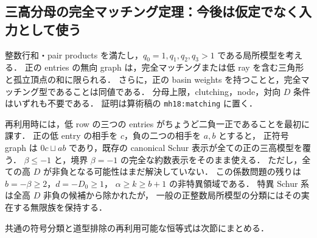 \subsection{三高分母の完全マッチング定理：今後は仮定でなく入力として使う}
\label{nm18:matching}

整数行和・pair products を満たし，$q_0=1,q_1,q_2,q_3>1$ である局所模型を考える．
正の entries の無向 graph は，完全マッチングまたは低 ray を含む三角形と孤立頂点の和に限られる．
さらに，正の basin weights を持つことと，完全マッチング型であることは同値である．
分母上限，clutching，node，対向 $D$ 条件はいずれも不要である．
証明は算術稿の \texttt{mh18:matching} に置く．

再利用時には，低 row の三つの entries がちょうど二負一正であることを最初に課す．
正の低 entry の相手を $c$，負の二つの相手を $a,b$ とすると，
正符号 graph は $0c\sqcup ab$ であり，既存の canonical Schur 表示が全ての正の三高模型を覆う．
$\beta\le-1$ と，境界 $\beta=-1$ の完全な約数表示をそのまま使える．
ただし，全ての高 $D$ が非負となる可能性はまだ解決していない．
この係数問題の残りは $b=-\beta\ge2$，$d=-D_0\ge1$，
$\alpha\ge k\ge b+1$ の非特異領域である．
特異 Schur 系は全高 $D$ 非負の候補から除かれたが，
一般の正整数局所模型の分類にはその実在する無限族を保持する．

共通の符号分類と道型排除の再利用可能な恒等式は次節にまとめる．
